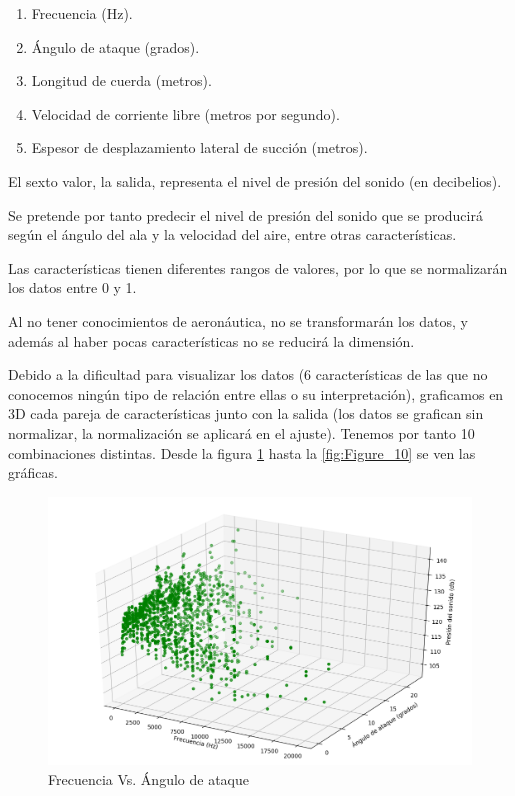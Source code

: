 \documentclass[12pt,spanish]{article} %
\begin{document}
\begin{enumerate}
\item Frecuencia (Hz).
\item Ángulo de ataque (grados).
\item Longitud de cuerda (metros).
\item Velocidad de corriente libre (metros por segundo).
\item Espesor de desplazamiento lateral de succión (metros).
\end{enumerate}

El sexto valor, la salida, representa el nivel de presión del sonido (en decibelios).

Se pretende por tanto predecir el nivel de presión del sonido que se producirá según el ángulo del ala y la velocidad del aire, entre otras características.

Las características tienen diferentes rangos de valores, por lo que se normalizarán los datos entre 0 y 1.

Al no tener conocimientos de aeronáutica, no se transformarán los datos, y además al haber pocas características no se reducirá la dimensión. 

Debido a la dificultad para visualizar los datos (6 características de las que no conocemos ningún tipo de relación entre ellas o su interpretación), graficamos en 3D cada pareja de características junto con la salida (los datos se grafican sin normalizar, la normalización se aplicará en el ajuste). Tenemos por tanto 10 combinaciones distintas. Desde la figura \ref{fig:Figure_1} hasta la \ref{fig:Figure_10} se ven las gráficas.

\begin{figure}[H]
  \begin{center}
  \includegraphics[scale=.6]{Figure_1}
  \caption{Frecuencia Vs. Ángulo de ataque}
  \label{fig:Figure_1}
  \end{center}
\end{figure}
\end{document}
